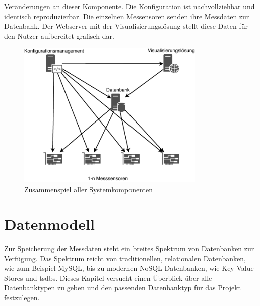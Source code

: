 \documentclass[titlepage]{report}
\begin{document}
Veränderungen an dieser Komponente. Die Konfiguration ist
nachvollziehbar und identisch reproduzierbar.
Die einzelnen Messensoren senden ihre Messdaten zur Datenbank. Der
Webserver mit der Visualisierungslösung stellt diese Daten für den Nutzer aufbereitet
 grafisch dar.
\begin{figure}[H]
    \centering
    \includegraphics[width=0.8\textwidth]{figures/network.pdf}
    \caption{Zusammenspiel aller Systemkomponenten}\label{fig:network}
\end{figure}
\section*{Datenmodell}
Zur Speicherung der Messdaten steht ein breites Spektrum von Datenbanken
zur Verfügung. Das Spektrum reicht von traditionellen, relationalen
Datenbanken, wie zum Beispiel MySQL, bis zu modernen
NoSQL\hyp{}Datenbanken, wie Key\hyp{}Value\hyp{}Stores und \glspl{tsdb}.
Dieses Kapitel versucht einen Überblick über alle Datenbanktypen zu
geben und den passenden Datenbanktyp für das Projekt festzulegen.
\end{document}
